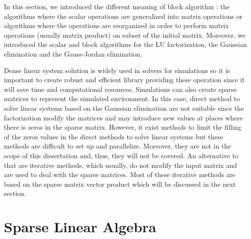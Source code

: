 In this section, we introduced the different meaning of block algorithm : the algorithms where the scalar operations are generalized into matrix operations or algorithms where the operations are reorganized in order to perform matrix operations (usually matrix product) on subset of the initial matrix.
Moreover, we introduced the scalar and block algorithms for the LU factorization, the Gaussian elimination and the Gauss-Jordan elimination.

Dense linear system solution is widely used in solvers for simulations so it is important to create robust and efficient library providing these operation since it will save time and computational resources.
Simulations can also create sparse matrices to represent the simulated environment.
In this case, direct method to solve linear systems based on the Gaussian elimination are not suitable since the factorization modify the matrices and may introduce new values at places where there is zeros in the sparse matrix.
However, it exist methods to limit the filling of the zeros values in the direct methods to solve linear systems but these methods are difficult to set up and parallelize.
Moreover, they are not in the scope of this dissertation and, thus, they will not be covered.
An alternative to that are iterative methods, which usually, do not modify the input matrix and are used to deal with the sparse matrices.
Most of these iterative methods are based on the sparse matrix vector product which will be discussed in the next section.


\section{Sparse Linear Algebra}

